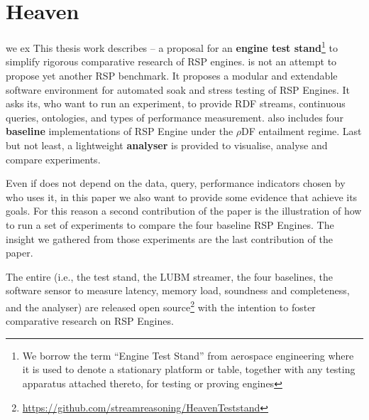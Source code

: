 \section{Heaven}\label{sec:heaven-intro}

we ex
This thesis work describes \name -- a proposal for an \textbf{engine test stand}\footnote{We borrow the term ``Engine Test Stand'' from aerospace engineering where it is used to denote a stationary platform or table, together with any testing apparatus attached thereto, for testing or proving engines} to simplify rigorous comparative research of RSP engines. \name is not an attempt to propose yet another RSP benchmark. It proposes a modular and extendable software environment for automated soak and stress testing \cite{dustin2009implementing} of RSP Engines. It asks its, who want to run an experiment, to provide RDF streams, continuous queries, ontologies, and types of performance measurement. \name also includes four \textbf{baseline} implementations of RSP Engine under the $\rho$DF \cite{DBLP:conf/esws/MunozPG07} entailment regime. Last but not least, a lightweight \textbf{analyser} is provided to visualise, analyse and compare experiments. 

Even if \name does not depend on the data, query, performance indicators chosen by who uses it, in this paper we also want to provide some evidence that \name achieve its goals. For this reason  a second contribution of the paper is the illustration of how to run a set of experiments to compare the four baseline RSP Engines. The insight we gathered from those experiments are the last contribution of the paper.


The entire \name (i.e., the test stand, the LUBM streamer, the four baselines, the software sensor to measure latency, memory load, soundness and completeness, and the analyser) are released open source\footnote{\url{https://github.com/streamreasoning/HeavenTeststand}} with the intention to foster comparative research on RSP Engines.


